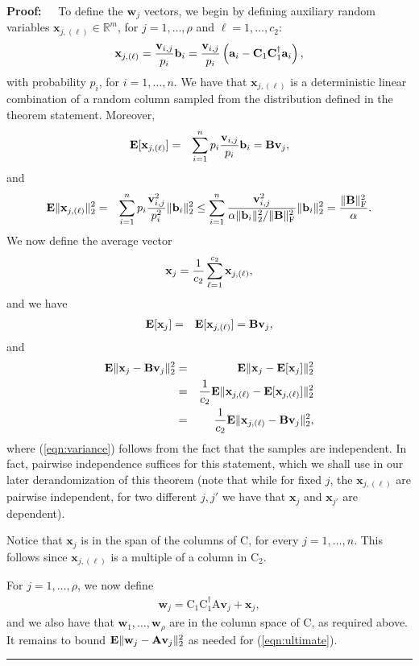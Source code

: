 \documentclass[11pt]{article}
\newcommand{\FNormS}[1]{\mbox{}\|#1\|_\mathrm{F}^2}
\newenvironment{proof}{\begin{trivlist} \item {\bf Proof:~~}}
  {\qed\end{trivlist}}
\newcommand{\mat}[1]{{\ensuremath{\bm{\mathrm{#1}}}}}
\def\b{{\mathbf b}}
\def\ve{{\mathbf v}}
\def\matA{\mat{A}}
\def\matB{\mat{B}}
\def\matC{\mat{C}}
\def\w{{\mathbf{w}}}
\def\frac#1#2{{#1\over #2}}
\def\qed{\hfill\rule{2mm}{2mm}}
\def\x{{\mathbf x}}
\def\a{{\mathbf a}}
\def\b{{\mathbf b}}
\begin{document}
\begin{proof}
To define the $\w_j$ vectors, we begin by defining auxiliary random variables $\x_{j, (\ell)} \in \mathbb{R}^m$,
for $j = 1, \ldots, \rho$ and $\ell = 1, \ldots, c_2$:
$$\x_{j, (\ell)} = \frac{\ve_{i,j}}{p_i}\b_i = \frac{\ve_{i,j}}{p_i} \left (\a_i - \matC_1 \matC_1^{\dagger}\a_i \right ),$$
with probability $p_i$, for $i = 1, \ldots, n$. 
We have that $\x_{j, (\ell)}$ is a deterministic linear combination of a random column sampled from the distribution
defined in the theorem statement. Moreover,
\begin{eqnarray*}
{\bf E}[\x_{j, (\ell)}] & = & \sum_{i=1}^n p_i \frac{\ve_{i,j}}{p_i} \b_i = \matB \ve_j,
\end{eqnarray*}
and
\begin{eqnarray*}
{\bf E}\|\x_{j, (\ell)}\|_2^2 & = & \sum_{i=1}^n p_i \frac{\ve_{i,j}^2}{p_i^2} \|\b_i\|_2^2
\leq \sum_{i=1}^n \frac{\ve_{i,j}^2}{\alpha \|\b_i\|_2^2/\FNormS{\matB}} \|\b_i\|_2^2
= \frac{\FNormS{\matB}}{\alpha}.
\end{eqnarray*}
We now define the average vector
$$\x_j = \frac{1}{c_2} \sum_{\ell = 1}^{c_2} \x_{j, (\ell)},$$
and we have
\begin{eqnarray*}
{\bf E}[\x_j] & = & {\bf E}[\x_{j, (\ell)}] = \matB\ve_j,
\end{eqnarray*}
and
\begin{eqnarray}\label{eqn:variance}
{\bf E}\|\x_j-\matB\ve_j\|_2^2 & = & {\bf E}\|\x_j - {\bf E}[\x_j]\|_2^2 \notag \\
& = & \frac{1}{c_2} {\bf E}\|\x_{j, (\ell)}-{\bf E}[\x_{j, (\ell)}]\|_2^2\\
& = & \frac{1}{c_2} {\bf E}\|\x_{j, (\ell)}-\matB\ve_j\|_2^2 \notag,
\end{eqnarray}
where (\ref{eqn:variance}) follows from the fact that the samples are independent. In fact, pairwise independence
suffices for this statement, which we shall use in our later derandomization of this theorem
(note that while for
fixed $j$, the $\x_{j, (\ell)}$ are pairwise independent, for two different $j, j'$ we have that $\x_j$ 
and $\x_{j'}$ are dependent). 

Notice that $\x_j$ is in the span of the columns of $\matC$, for every $j = 1, \ldots, n$.
This follows since $\x_{j, (\ell)}$ is a multiple of a column in $\matC_2$. 

For $j = 1, \ldots, \rho$, we now define
\begin{eqnarray}\label{eqn:w}
\w_j = \matC_1 \matC_1^{\dagger} \matA \ve_j + \x_j,
\end{eqnarray}
and we also have that $\w_1, \ldots, \w_{\rho}$ are in the column space of $\matC$, as required above. It remains
to bound ${\bf E}\|\w_j - \matA\ve_j\|_2^2$ as needed for (\ref{eqn:ultimate}). 


\end{proof}
\end{document}

